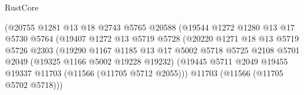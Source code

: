 \begin{lexlean}{RustCore}
\begin{coremodule}
                                          (@20755
                                            @1281
                                            @13
                                            @18
                                            @2743
                                            @5765
                                            @20588
                                            (@19544
                                              @1272
                                              @1280
                                              @13
                                              @17
                                              @5730
                                              @5764
                                              (@19407
                                                @1272
                                                @13
                                                @5719
                                                @5728
                                                (@20220
                                                  @1271
                                                  @18
                                                  @13
                                                  @5719
                                                  @5726
                                                  @2303
                                                  (@19290
                                                    @1167
                                                    @1185
                                                    @13
                                                    @17
                                                    @5002
                                                    @5718
                                                    @5725
                                                    @2108
                                                    @5701
                                                    @2049
                                                    (@19325 @1166 @5002 @19228 @19232)
                                                    (@19445
                                                      @5711
                                                      @2049
                                                      @19455
                                                      @19337
                                                      @11703
                                                      (@11566 (@11705 @5712 @2055)))
                                                    @11703
                                                    (@11566 (@11705 @5702 @5718)))

\end{coremodule}
\end{lexlean}

